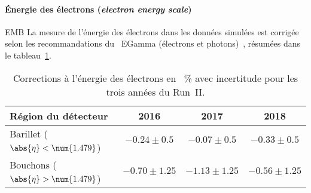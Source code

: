 \paragraph{Énergie des électrons (\emph{electron energy scale})} EMB
La mesure de l'énergie des électrons dans les données simulées est corrigée selon les recommandations du \POG\ EGamma (électrons et photons)~\cite{EGammaPOG}, résumées dans le tableau~\ref{tab-chapter-HTT_analysis-section-corrections-eleES}.
\begin{table}[h]
\centering
\begin{tabular}{lccc}
\toprule
Région du détecteur & 2016 & 2017 & 2018\\
\midrule
Barillet ($\abs{\eta}<\num{1.479}$) & $\num{-0.24}\pm\num{0.5}$ & $\num{-0.07}\pm\num{0.5}$ & $\num{-0.33}\pm\num{0.5}$ \\
Bouchons ($\abs{\eta}>\num{1.479}$) & $\num{-0.70}\pm\num{1.25}$ & $\num{-1.13}\pm\num{1.25}$ & $\num{-0.56}\pm\num{1.25}$ \\
\bottomrule
\end{tabular}
\caption[Corrections à l'énergie des électrons.]{Corrections à l'énergie des électrons en \SI{}{\%} avec incertitude pour les trois années du Run~II.}
\label{tab-chapter-HTT_analysis-section-corrections-eleES}
\end{table}